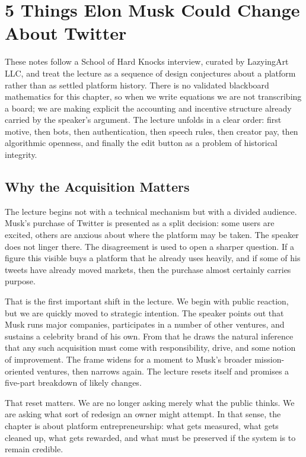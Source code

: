 \chapter{5 Things Elon Musk Could Change About Twitter}

These notes follow a School of Hard Knocks interview, curated by LazyingArt LLC, and treat the lecture as a sequence of design conjectures about a platform rather than as settled platform history. There is no validated blackboard mathematics for this chapter, so when we write equations we are not transcribing a board; we are making explicit the accounting and incentive structure already carried by the speaker's argument. The lecture unfolds in a clear order: first motive, then bots, then authentication, then speech rules, then creator pay, then algorithmic openness, and finally the edit button as a problem of historical integrity.

\section{Why the Acquisition Matters}

The lecture begins not with a technical mechanism but with a divided audience. Musk's purchase of Twitter is presented as a split decision: some users are excited, others are anxious about where the platform may be taken. The speaker does not linger there. The disagreement is used to open a sharper question. If a figure this visible buys a platform that he already uses heavily, and if some of his tweets have already moved markets, then the purchase almost certainly carries purpose.

That is the first important shift in the lecture. We begin with public reaction, but we are quickly moved to strategic intention. The speaker points out that Musk runs major companies, participates in a number of other ventures, and sustains a celebrity brand of his own. From that he draws the natural inference that any such acquisition must come with responsibility, drive, and some notion of improvement. The frame widens for a moment to Musk's broader mission-oriented ventures, then narrows again. The lecture resets itself and promises a five-part breakdown of likely changes.

That reset matters. We are no longer asking merely what the public thinks. We are asking what sort of redesign an owner might attempt. In that sense, the chapter is about platform entrepreneurship: what gets measured, what gets cleaned up, what gets rewarded, and what must be preserved if the system is to remain credible.

